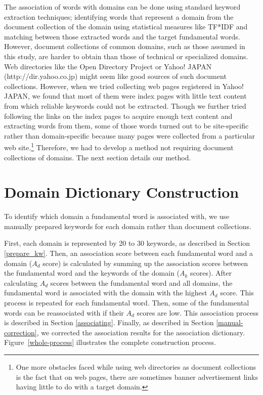 \documentclass[english]{jnlp_1.4_rep}
\newcommand{\dom}[1]{}
\begin{document}
The association of words with domains can be done using standard keyword
extraction techniques;
identifying words that represent a domain from the document collection of
the domain using statistical measures like TF*IDF and matching between
those extracted words and the target fundamental words.
However, document collections of common domains, such
as those assumed in this study, are harder to obtain
than those of technical or specialized domains.
Web directories like the Open Directory Project
 or Yahoo!
JAPAN (http://dir.yahoo.co.jp) might seem like good sources of
 such document collections.
However, when we tried collecting web pages registered in Yahoo! JAPAN,
we found that most of them were index pages with little text
content from which reliable keywords could not be extracted.
Though we further tried following the links on the index pages to acquire
enough text content and extracting words from them,
some of those words turned out to be site-specific rather than
domain-specific because many pages were collected from a
particular web site.\footnote{
One more obstacles faced while using web directories as document
collections is the fact that 
on web pages, there are sometimes banner advertisement
links having little to do with a target domain.}
Therefore, we had to develop a method not requiring
document collections of domains.
The next section details our method.


\section{Domain Dictionary Construction}
\label{sec:domain-dictionary-construction}

To identify which domain a fundamental word is associated with, we use
manually prepared keywords for each domain
rather than document collections.

First, each domain is represented by 20 to 30 keywords, as
described in Section \ref{prepare_kw}.
Then, an association score between each fundamental word and a domain
($A_d$ score) is calculated by
summing up the association scores between the fundamental word and the
keywords of the domain ($A_k$ scores). 
After calculating $A_d$ scores between the fundamental word and all domains,
the fundamental word is associated with the domain with the highest $A_d$ score.
This process is repeated for each fundamental word.
Then,
some of the fundamental words
can be
reassociated with \dom{nodomain} if their $A_d$ scores are low.
This association process is described in Section \ref{associating}.
Finally, 
as described in Section \ref{manual-correction},
we corrected the association results for the association dictionary.
Figure~\ref{whole-process} illustrates the complete construction process.
\end{document}
